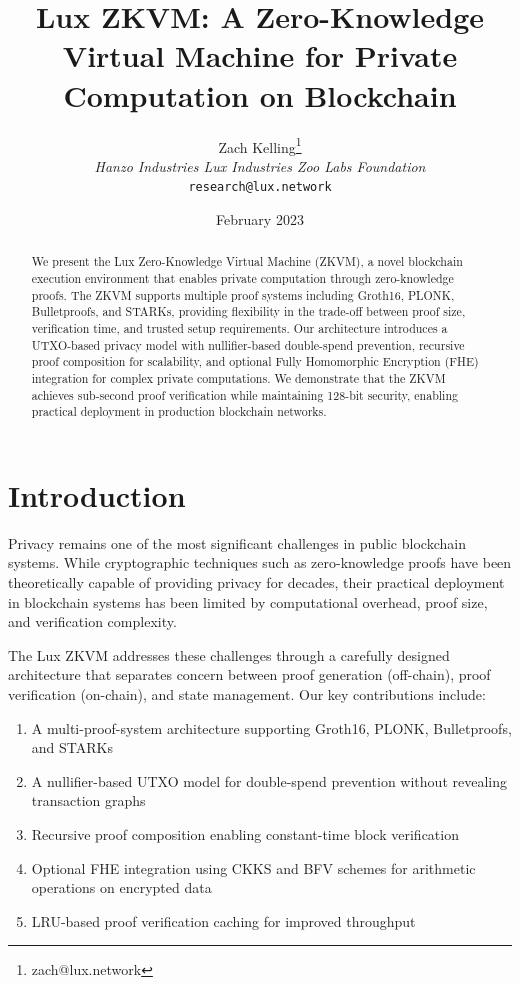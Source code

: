 \documentclass[11pt,a4paper]{article}
\title{\textbf{Lux ZKVM: A Zero-Knowledge Virtual Machine for Private Computation on Blockchain}}
\author{Zach Kelling\thanks{zach@lux.network} \\ \textit{Hanzo Industries \quad Lux Industries \quad Zoo Labs Foundation} \\ \texttt{research@lux.network}}
\date{February 2023}
\begin{document}
\maketitle

\begin{abstract}
We present the Lux Zero-Knowledge Virtual Machine (ZKVM), a novel blockchain execution environment that enables private computation through zero-knowledge proofs. The ZKVM supports multiple proof systems including Groth16, PLONK, Bulletproofs, and STARKs, providing flexibility in the trade-off between proof size, verification time, and trusted setup requirements. Our architecture introduces a UTXO-based privacy model with nullifier-based double-spend prevention, recursive proof composition for scalability, and optional Fully Homomorphic Encryption (FHE) integration for complex private computations. We demonstrate that the ZKVM achieves sub-second proof verification while maintaining 128-bit security, enabling practical deployment in production blockchain networks.
\end{abstract}

\section{Introduction}

Privacy remains one of the most significant challenges in public blockchain systems. While cryptographic techniques such as zero-knowledge proofs have been theoretically capable of providing privacy for decades, their practical deployment in blockchain systems has been limited by computational overhead, proof size, and verification complexity.

The Lux ZKVM addresses these challenges through a carefully designed architecture that separates concern between proof generation (off-chain), proof verification (on-chain), and state management. Our key contributions include:

\begin{enumerate}
    \item A multi-proof-system architecture supporting Groth16, PLONK, Bulletproofs, and STARKs
    \item A nullifier-based UTXO model for double-spend prevention without revealing transaction graphs
    \item Recursive proof composition enabling constant-time block verification
    \item Optional FHE integration using CKKS and BFV schemes for arithmetic operations on encrypted data
    \item LRU-based proof verification caching for improved throughput
\end{enumerate}
\end{document}
